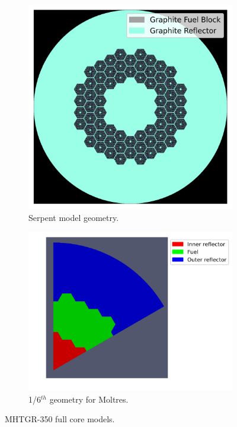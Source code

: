 \documentclass[11pt,letterpaper]{article}
\begin{document}
\begin{figure}[htbp!]
	\centering
	\begin{subfigure}[t]{0.4\textwidth}
		\centering
		\includegraphics[width=\linewidth]{figures-fullcore/oecd-fullcore}
		\caption{Serpent model geometry.}
	\end{subfigure}
	\begin{subfigure}[t]{0.4\textwidth}
		\centering
		\includegraphics[width=\linewidth]{figures-fullcore/3D-fullcore-60-homo-meshB2}
		\caption{1/6$^{th}$ geometry for Moltres.}
	\end{subfigure}
	\hfill
	\caption{MHTGR-350 full core models.}
	\label{fig:fullcoremodel}
\end{figure}
\end{document}
